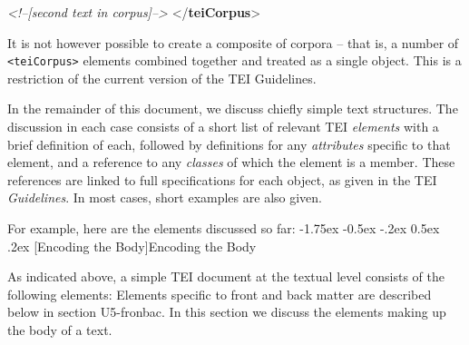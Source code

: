 \documentclass[11pt,twoside]{article}\makeatletter
\makeatletter
\renewcommand\section{\@startsection {section}{1}{\z@}%
     {-1.75ex \@plus -0.5ex \@minus -.2ex}%
     {0.5ex \@plus .2ex}%
     {\reset@font\Large\bfseries\sffamily}}
\makeatother
\begin{document}
\begin{shaded}
\textit{<!--[second text in corpus]-->}\mbox{}\newline 
\hspace*{6pt}\mbox{}\newline 
{}\mbox{}\newline 
{</\textbf{teiCorpus}>}\end{shaded}\egroup\par \noindent  It is not however possible to create a composite of corpora -- that is, a number of \texttt{<teiCorpus>} elements combined together and treated as a single object. This is a restriction of the current version of the TEI Guidelines.\par
In the remainder of this document, we discuss chiefly simple text structures. The discussion in each case consists of a short list of relevant TEI \textit{elements} with a brief definition of each, followed by definitions for any \textit{attributes} specific to that element, and a reference to any \textit{classes} of which the element is a member. These references are linked to full specifications for each object, as given in the TEI \textit{Guidelines}. In most cases, short examples are also given.\par
For example, here are the elements discussed so far: 
\section[{Encoding the Body}]{Encoding the Body}\label{U5-body}\par
As indicated above, a simple TEI document at the textual level consists of the following elements:  Elements specific to front and back matter are described below in section U5-fronbac. In this section we discuss the elements making up the body of a text.
\end{document}
